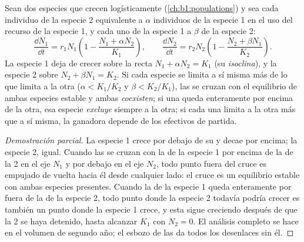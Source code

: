 \begin{proposition}\label{prop:b1:species-interactions:lotka}
Sean dos especies que crecen logísticamente (\cref{ch:b1:populations}) y sea
cada individuo de la especie 2 equivalente a $\alpha$ individuos de la
especie 1 en el uso del recurso de la especie 1, y cada uno de la especie 1
a $\beta$ de la especie 2:
\[
\frac{\dd N_1}{\dd t} = r_1 N_1\left(1 - \frac{N_1 + \alpha N_2}{K_1}\right),
\qquad
\frac{\dd N_2}{\dd t} = r_2 N_2\left(1 - \frac{N_2 + \beta N_1}{K_2}\right).
\]
La especie 1 deja de crecer sobre la recta $N_1 + \alpha N_2 = K_1$ (su
\emph{isoclina}), y la especie 2 sobre $N_2 + \beta N_1 = K_2$. Si
cada especie se limita a sí misma más de lo que limita a la otra ($\alpha <
K_1/K_2$ y $\beta < K_2/K_1$), las  se cruzan con el equilibrio de
ambas especies estable y ambas \emph{coexisten}; si una  queda
enteramente por encima de la otra, esa especie \emph{excluye} siempre a la
otra; si cada una limita a la otra más que a sí misma, la ganadora depende
de los efectivos de partida.
\end{proposition}
\begin{proof}[Demostración parcial]
La especie 1 crece por debajo de su  y decae por encima; la especie
2, igual. Cuando las  se cruzan con la de la especie 1 por encima
de la de la 2 en el eje $N_1$ y por debajo en el eje $N_2$, todo punto fuera
del cruce es empujado de vuelta hacia él desde cualquier lado: el cruce es
un equilibrio estable con ambas especies presentes. Cuando la  de la
especie 1 queda enteramente por fuera de la de la especie 2, todo punto
donde la especie 2 todavía podría crecer es también un punto donde la
especie 1 crece, y esta sigue creciendo después de que la 2 se haya
detenido, hasta alcanzar $K_1$ con $N_2 = 0$. El análisis completo se hace
en el volumen de segundo año; el esbozo de las  da todos los
desenlaces sin él.
\end{proof}

